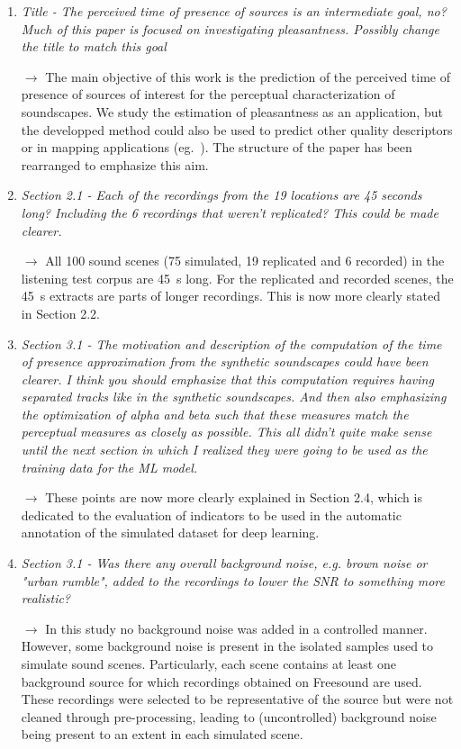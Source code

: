 \documentclass[10pt]{article}
\begin{document}
\begin{enumerate}
\item \emph{Title - The perceived time of presence of sources is an intermediate goal, no? Much of this paper is focused on investigating pleasantness. Possibly change the title to match this goal}

$\rightarrow$ The main objective of this work is the prediction of the perceived time of presence of sources of interest for the perceptual characterization of soundscapes. We study the estimation of pleasantness as an application, but the developped method could also be used to predict other quality descriptors or in mapping applications (eg.~\cite{lavandier2016}). The structure of the paper has been rearranged to emphasize this aim.

\item \emph{Section 2.1 - Each of the recordings from the 19 locations are 45 seconds long? Including the 6 recordings that weren't replicated? This could be made clearer.}

$\rightarrow$ All 100 sound scenes (75 simulated, 19 replicated and 6 recorded) in the listening test corpus are 45~s long. For the replicated and recorded scenes, the 45~s extracts are parts of longer recordings. This is now more clearly stated in Section 2.2.

\item \emph{Section 3.1 - The motivation and description of the computation of the time of presence approximation from the synthetic soundscapes could have been clearer. I think you should emphasize that this computation requires having separated tracks like in the synthetic soundscapes. And then also emphasizing the optimization of alpha and beta such that these measures match the perceptual measures as closely as possible. This all didn't quite make sense until the next section in which I realized they were going to be used as the training data for the ML model.}

$\rightarrow$ These points are now more clearly explained in Section 2.4, which is dedicated to the evaluation of indicators to be used in the automatic annotation of the simulated dataset for deep learning.

\item \emph{Section 3.1 - Was there any overall background noise, e.g. brown noise or "urban rumble", added to the recordings to lower the SNR to something more realistic?}

$\rightarrow$ In this study no background noise was added in a controlled manner. However, some background noise is present in the isolated samples used to simulate sound scenes. Particularly, each scene contains at least one background source for which recordings obtained on Freesound are used. These recordings were selected to be representative of the source but were not cleaned through pre-processing, leading to (uncontrolled) background noise being present to an extent in each simulated scene.


\end{enumerate}
\end{document}
